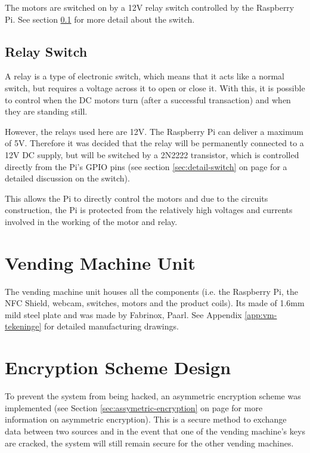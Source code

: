 The motors are switched on by a 12V relay switch controlled by the Raspberry Pi. See section
\ref{sec:relay-switch} for more detail about the switch.

\subsection{Relay Switch}
\label{sec:relay-switch}

A relay is a type of electronic switch, which means that it acts like a normal switch, but
requires a voltage across it to open or close it. With this, it is possible to control
when the DC motors turn (after a successful transaction) and when they are standing still. 

However, the relays used here are 12V. The Raspberry Pi can deliver a maximum of 5V. Therefore
it was decided that the relay will be permanently connected to a 12V DC supply, but will be
switched by a 2N2222 transistor, which is controlled directly from the Pi's  GPIO pins (see
section \ref{sec:detail-switch} on page \pageref{sec:detail-switch} for a detailed
discussion on the switch).

This allows the Pi to directly control the motors and due to the circuits construction, the Pi
is protected from the relatively high voltages and currents involved in the working of the
motor and relay.

\section{Vending Machine Unit}

The vending machine unit houses all the components (i.e. the Raspberry Pi, the NFC Shield,
webcam, switches, motors and the product coils). Its made of 1.6mm mild steel plate and was
made by Fabrinox, Paarl. See Appendix \ref{app:vm-tekeninge} for detailed manufacturing
drawings.

\section{Encryption Scheme Design}

To prevent the system from being hacked, an asymmetric encryption scheme was
implemented (see Section \ref{sec:assymetric-encryption} on page
\pageref{sec:assymetric-encryption} for more information on asymmetric encryption).
This is a secure method to exchange data between two sources and in the event that
one of the vending machine's keys are cracked, the system will still remain
secure for the other vending machines.

